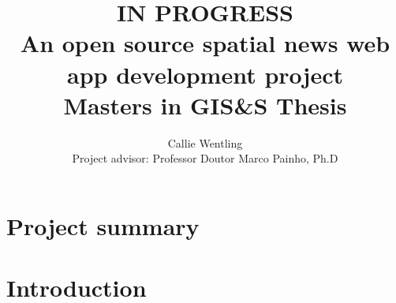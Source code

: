 \documentclass[11pt,usenames,dvipsnames]{article} %
\title{%
	IN PROGRESS\\
	An open source spatial news web app development project \\
	\large Masters in GIS\&S Thesis\\
}
\author{Callie Wentling\\
	\small Project advisor: Professor Doutor Marco Painho, Ph.D}
\begin{document}

\maketitle
\thispagestyle{empty} %


\vspace*{\fill}
\section*{Project summary}


%

% 

%

%

\newpage
\thispagestyle{empty} %
{\small
	\tableofcontents
}

{\small
	\listoffigures
}

{\small
	\listoftables
}

\newpage
{}

\newpage



\newpage
\section{Introduction} \label{sec:intro}

\end{document}
